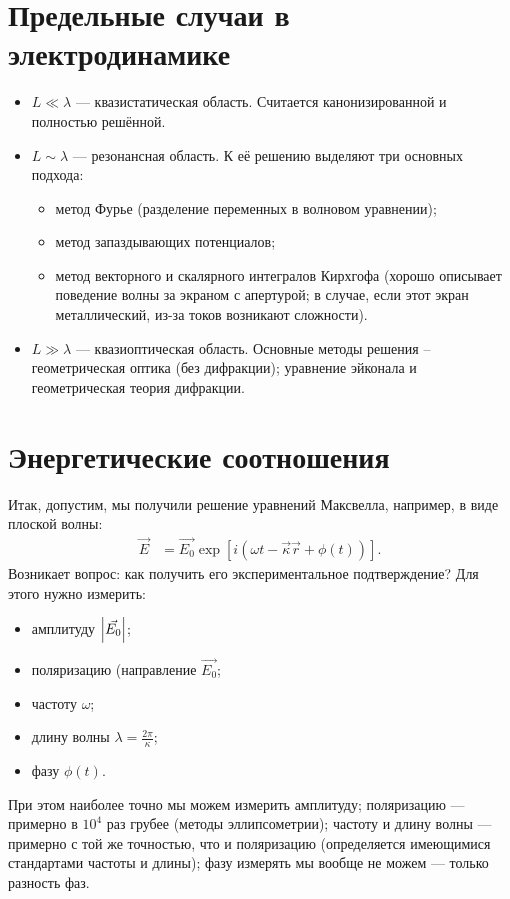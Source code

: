 \section{Предельные случаи в электродинамике}
\begin{itemize}
  \item \(L \ll \lambda\) --- квазистатическая область. Считается
  канонизированной и полностью решённой.
  \item \(L \sim \lambda\) --- резонансная область. К её решению выделяют три
  основных подхода:
  \begin{itemize}
    \item метод Фурье (разделение переменных в волновом уравнении);
    \item метод запаздывающих потенциалов;
    \item метод векторного и скалярного интегралов Кирхгофа (хорошо описывает
    поведение волны за экраном с апертурой; в случае, если этот экран
    металлический, из-за токов возникают сложности).
  \end{itemize}
  \item \(L \gg \lambda\) --- квазиоптическая область. Основные методы решения
  -- геометрическая оптика (без дифракции); уравнение эйконала и геометрическая
  теория дифракции.
\end{itemize}

\section{Энергетические соотношения}
Итак, допустим, мы получили решение уравнений Максвелла, например, в виде
плоской волны:
\begin{align*}
  \vec{E} &= \vec{E_0} \exp\left[i(\omega t - \vec{\kappa}\vec{r}
  + \phi(t))\right].
\end{align*}
Возникает вопрос: как получить его экспериментальное подтверждение? Для этого
нужно измерить:
\begin{itemize}
  \item амплитуду \(\left\lvert \vec{E_0} \right\rvert\);
  \item поляризацию (направление \(\vec{E_0}\);
  \item частоту \(\omega\);
  \item длину волны \(\lambda = \frac{2\pi}{\kappa}\);
  \item фазу \(\phi(t)\).
\end{itemize}
При этом наиболее точно мы можем измерить амплитуду; поляризацию --- примерно
в \(10^4\) раз грубее (методы эллипсометрии); частоту и длину волны --- примерно
с той же точностью, что и поляризацию (определяется имеющимися стандартами
частоты и длины); фазу измерять мы вообще не можем --- только разность фаз.

